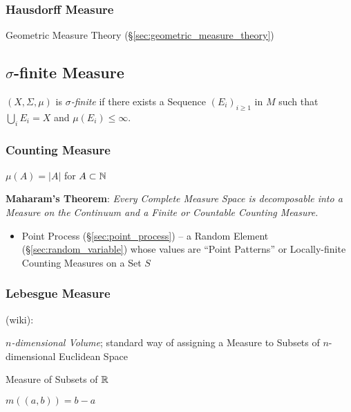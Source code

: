 \subsubsection{Hausdorff Measure}\label{sec:hausdorff_measure}

\fist Geometric Measure Theory (\S\ref{sec:geometric_measure_theory})



\subsection{$\sigma$-finite Measure}\label{sec:sigma_finite}

$(X,\Sigma,\mu)$ is \emph{$\sigma$-finite} if there exists a Sequence
$(E_i)_{i \geq 1}$ in $M$ such that $\bigcup_{i} E_i = X$ and
$\mu(E_i) \leq \infty$.



\subsubsection{Counting Measure}\label{sec:counting_measure}

$\mu(A) = |A|$ for $A \subset \mathbb{N}$

\textbf{Maharam's Theorem}: \emph{
  Every Complete Measure Space is decomposable into a Measure on the Continuum
  and a Finite or Countable Counting Measure.
}

\begin{itemize}
  \item Point Process (\S\ref{sec:point_process}) -- a Random Element
    (\S\ref{sec:random_variable}) whose values are ``Point Patterns'' or
    Locally-finite Counting Measures on a Set $S$
\end{itemize}



\subsubsection{Lebesgue Measure}\label{sec:lebesgue_measure}

(wiki):

\emph{$n$-dimensional Volume}; standard way of assigning a Measure to Subsets of
$n$-dimensional Euclidean Space

Measure of Subsets of $\mathbb{R}$

$m((a,b)) = b - a$

